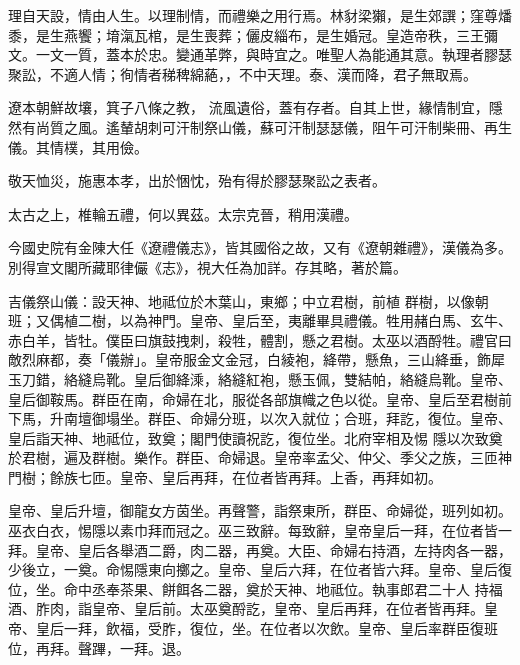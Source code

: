 
\begin{pinyinscope}

 理自天設，情由人生。以理制情，而禮樂之用行焉。林豺梁獺，是生郊譔；窪尊燔黍，是生燕饗；堉滊瓦棺，是生喪葬；儷皮緇布，是生婚冠。皇造帝秩，三王彌文。一文一質，蓋本於忠。變通革弊，與時宜之。唯聖人為能通其意。執理者膠瑟聚訟，不適人情；徇情者稊稗綿蕝，，不中天理。泰、漢而降，君子無取焉。



 遼本朝鮮故壤，箕子八條之教，
 流風遺俗，蓋有存者。自其上世，緣情制宜，隱然有尚質之風。遙輦胡刺可汗制祭山儀，蘇可汗制瑟瑟儀，阻午可汗制柴冊、再生儀。其情樸，其用儉。



 敬天恤災，施惠本孝，出於悃忱，殆有得於膠瑟聚訟之表者。



 太古之上，椎輪五禮，何以異茲。太宗克晉，稍用漢禮。



 今國史院有金陳大任《遼禮儀志》，皆其國俗之故，又有《遼朝雜禮》，漢儀為多。別得宣文閣所藏耶律儼《志》，視大任為加詳。存其略，著於篇。



 吉儀祭山儀：設天神、地祗位於木葉山，東鄉；中立君樹，前植
 群樹，以像朝班；又偶植二樹，以為神門。皇帝、皇后至，夷離畢具禮儀。牲用赭白馬、玄牛、赤白羊，皆牡。僕臣曰旗鼓拽刺，殺牲，體割，懸之君樹。太巫以酒酹牲。禮官曰敵烈麻都，奏「儀辦」。皇帝服金文金冠，白綾袍，絳帶，懸魚，三山絳垂，飾犀玉刀錯，絡縫烏靴。皇后御絳溗，絡縫紅袍，懸玉佩，雙結帕，絡縫烏靴。皇帝、皇后御鞍馬。群臣在南，命婦在北，服從各部旗幟之色以從。皇帝、皇后至君樹前下馬，升南壇御塌坐。群臣、命婦分班，以次入就位；合班，拜訖，復位。皇帝、皇后詣天神、地祗位，致奠；閣門使讀祝訖，復位坐。北府宰相及惕
 隱以次致奠於君樹，遍及群樹。樂作。群臣、命婦退。皇帝率孟父、仲父、季父之族，三匝神門樹；餘族七匝。皇帝、皇后再拜，在位者皆再拜。上香，再拜如初。



 皇帝、皇后升壇，御龍女方茵坐。再聲警，詣祭東所，群臣、命婦從，班列如初。巫衣白衣，惕隱以素巾拜而冠之。巫三致辭。每致辭，皇帝皇后一拜，在位者皆一拜。皇帝、皇后各舉酒二爵，肉二器，再奠。大臣、命婦右持酒，左持肉各一器，少後立，一奠。命惕隱東向擲之。皇帝、皇后六拜，在位者皆六拜。皇帝、皇后復位，坐。命中丞奉茶果、餅餌各二器，奠於天神、地祗位。執事郎君二十人
 持福酒、胙肉，詣皇帝、皇后前。太巫奠酹訖，皇帝、皇后再拜，在位者皆再拜。皇帝、皇后一拜，飲福，受胙，復位，坐。在位者以次飲。皇帝、皇后率群臣復班位，再拜。聲蹕，一拜。退。




\end{pinyinscope}
